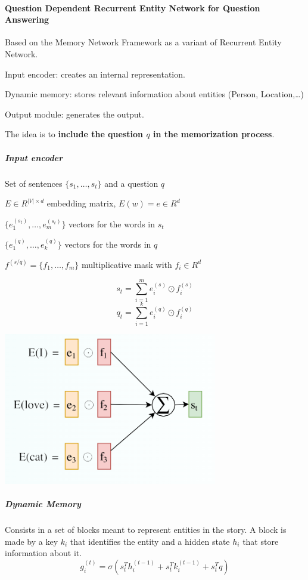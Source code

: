 \documentclass[10pt]{report}
\begin{document}
\paragraph{Question Dependent Recurrent Entity Network for Question Answering} Based on the Memory Network Framework as a variant of Recurrent Entity Network.
\begin{list}{}{}
	\item Input encoder: creates an internal representation.
	\item Dynamic memory: stores relevant information about entities (Person, Location,\ldots)
	\item Output module: generates the output.
\end{list}
The idea is to \textbf{include the question $q$ in the memorization process}.
\subparagraph{Input encoder} Set of sentences $\{s_1,\ldots,s_t\}$ and a question $q$
\begin{list}{}{}
	\item $E\in R^{|V|\times d}$ embedding matrix, $E(w) = e\in R^d$
	\item $\{e_1^{(s_t)},\ldots,e_m^{(s_t)}\}$ vectors for the words in $s_t$
	\item $\{e_1^{(q)},\ldots,e_k^{(q)}\}$ vectors for the words in $q$
	\item $f^{(s/q)} = \{f_1,\ldots,f_m\}$ multiplicative mask with $f_i\in R^d$
\end{list}
$$s_t = \sum_{i=1}^m e_i^{(s)}\odot f_i^{(s)}$$
$$q_t = \sum_{i=1}^k e_i^{(q)}\odot f_i^{(q)}$$
\begin{center}
	\includegraphics[scale=0.5]{100.png}
\end{center}
\subparagraph{Dynamic Memory} Consists in a set of blocks meant to represent entities in the story. A block is made by a key $k_i$ that identifies the entity and a hidden state $h_i$ that store information about it.
$$g_i^{(t)} = \sigma(s_t^Th_i^{(t-1)} + s_t^Tk_i^{(t-1)} + s_t^Tq)$$
\end{document}
